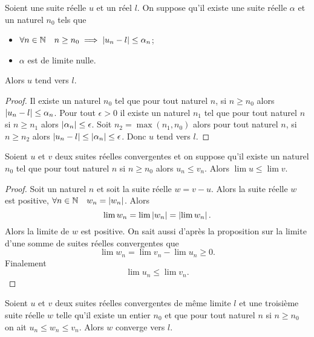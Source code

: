 \begin{prop}
  Soient une suite réelle $u$ et un réel $l$. On suppose qu'il existe une suite réelle $\alpha$ et un naturel $n_0$ tels que
  \begin{itemize}
  \item $\forall n \in \mathbb{N} \quad n \geq n_0 \implies \left\lvert u_n-l\right\rvert \leq \alpha_n$;
  \item $\alpha$ est de limite nulle.
  \end{itemize}
  Alors $u$ tend vers $l$.
\end{prop}
\begin{proof}
  Il existe un naturel $n_0$ tel que pour tout naturel $n$, si $n \geq n_0$ alors $\left\lvert u_n-l\right\rvert \leq \alpha_n$. Pour tout $\epsilon>0$ il existe un naturel $n_1$ tel que pour tout naturel $n$ si $n\geq n_1$ alors $\left\lvert\alpha_n\right\rvert \leq \epsilon$. Soit $n_2=\max(n_1,n_0)$ alors pour tout naturel $n$, si $n \geq n_2$ alors $\left\lvert u_n-l\right\rvert\leq \left\lvert\alpha_n\right\rvert\leq \epsilon$. Donc $u$ tend vers $l$.
\end{proof}
\begin{prop}
  Soient $u$ et $v$ deux suites réelles convergentes et on suppose qu'il existe un naturel $n_0$ tel que pour tout naturel $n$ si $n \geq n_0$ alors $u_n \leq v_n$. Alors $\lim u \leq \lim v$.
\end{prop}
\begin{proof}
  Soit un naturel $n$ et soit la suite réelle $w=v-u$. Alors la suite réelle $w$ est positive, $\forall n \in \mathbb{N} \quad w_n=\left\lvert w_n\right\rvert$. Alors
  \begin{equation}
    \lim w_n=\lim \left\lvert w_n\right\rvert=\left\lvert\lim w_n\right\rvert.
  \end{equation}
Alors la limite de $w$ est positive. On sait aussi d'après la proposition sur la limite d'une somme de suites réelles convergentes que
\begin{equation}
  \lim w_n = \lim v_n - \lim u_n \geq 0.
\end{equation}
Finalement
\begin{equation}
  \lim u_n \leq \lim v_n.
\end{equation}
\end{proof}
\begin{theo}
  Soient $u$ et $v$ deux suites réelles convergentes de même limite $l$ et une troisième suite réelle $w$ telle qu'il existe un entier $n_0$ et que pour tout naturel $n$ si $n \geq n_0$ on ait $u_n \leq w_n \leq v_n$. Alors $w$ converge vers $l$.
\end{theo}
